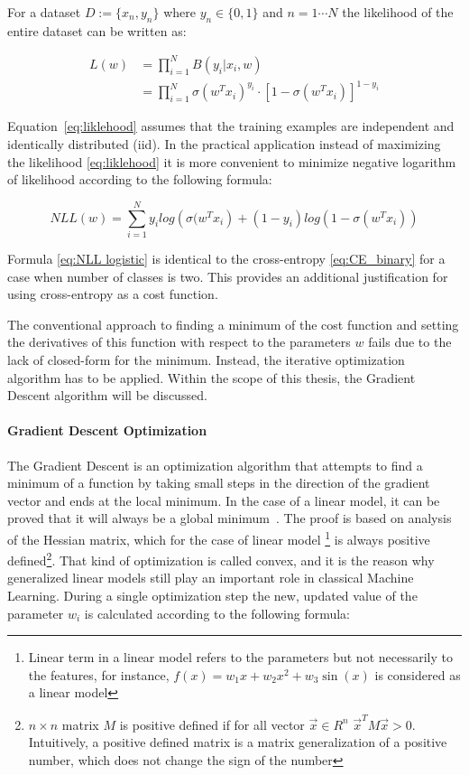 For a dataset $D:=\{x_{n}, y_n\}$ where $y_{n} \in \{0,1\}$ and $n=1 \cdots N$ the likelihood of the entire dataset can be written as: 

\begin{align}
\label{eq:liklehood}
        L(w) &= \prod_{i=1}^{N} B(y_i|x_i, w) \nonumber \\
        &= \prod_{i=1}^{N} \sigma(w^{T}x_i)^{y_i}\cdot \left[1- \sigma(w^{T}x_i) \right]^{1-y_i}
\end{align}

Equation~\ref{eq:liklehood} assumes that the training examples are independent and identically distributed (iid). In the practical application instead of maximizing the likelihood \ref{eq:liklehood} it is more convenient to minimize negative logarithm of likelihood according to the following formula:

\begin{equation}
\label{eq:NLL logistic}
    NLL(w) = \sum_{i=1}^{N}y_{i}log\left( \sigma(w^{T}x_{i}\right)+(1-y_i)log(1-\sigma(w^{T}x_{i}))
\end{equation}

Formula \ref{eq:NLL logistic} is identical to the cross-entropy \ref{eq:CE_binary} for a case when number of classes is two. This provides an additional justification for using cross-entropy as a cost function. 

The conventional approach to finding a minimum of the cost function and setting the derivatives of this function with respect to the parameters $w$ fails due to the lack of closed-form for the minimum. Instead, the iterative optimization algorithm has to be applied. Within the scope of this thesis, the Gradient Descent algorithm will be discussed.    

\paragraph{Gradient Descent Optimization} \mbox{}

The Gradient Descent is an optimization algorithm that attempts to find a minimum of a function by taking small steps in the direction of the gradient vector and ends at the local minimum. In the case of a linear model, it can be proved that it will always be a global minimum~\cite{bishop}. The proof is based on analysis of the Hessian matrix, which for the case of linear model \footnote{Linear term in a linear model refers to the parameters but not necessarily to the features, for instance, $f(x)=w_1x+w_2x^2 + w_3 \sin(x)$ is considered as a linear model} is always positive defined\footnote{$n \times n$ matrix $M$ is positive defined if for all vector $\vec{x} \in R^{n}$ $\vec{x}^{T}M\vec{x} > 0$. Intuitively, a positive defined matrix is a matrix generalization of a positive number, which does not change the sign of the number}. 
That kind of optimization is called convex, and it is the reason why generalized linear models still play an important role in classical Machine Learning.  
During a single optimization step the new, updated value of the parameter $w_i$ is calculated according to the following formula: 

